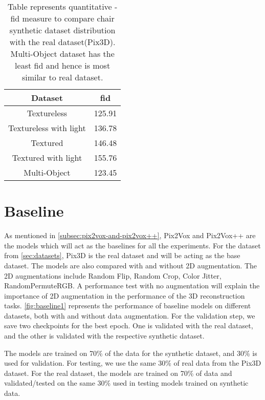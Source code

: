 \begin{table}[ht]
    \centering
    \begin{tabular}{|c |c |}
        \hline
        Dataset & \gls{fid} \\ [0.5ex]
        \hline\hline
        Textureless & 125.91 \\
        \hline
        Textureless with light & 136.78 \\
        \hline
        Textured  & 146.48 \\
        \hline
        Textured with light  & 155.76 \\
        \hline
        Multi-Object & 123.45 \\[1ex]
        \hline
    \end{tabular}
    \caption{Table represents quantitative - \gls{fid} measure to compare chair synthetic dataset distribution with the real dataset(Pix3D).
    Multi-Object dataset has the least \gls{fid} and hence is most similar to real dataset.}
    \label{tab:quantitative-dataset-comparison-chair-dataset}
\end{table}

\section{Baseline}\label{sec:baseline}

As mentioned in \autoref{subsec:pix2vox-and-pix2vox++}, Pix2Vox and Pix2Vox++ are the models which will act as the baselines for all the experiments.
For the dataset from \autoref{sec:datasets}, Pix3D is the real dataset and will be acting as the base dataset.
The models are also compared with and without 2D augmentation.
The 2D augmentations include Random Flip, Random Crop, Color Jitter, RandomPermuteRGB\@.
A performance test with no augmentation will explain the importance of 2D augmentation in the performance of the 3D reconstruction tasks.
\autoref{fig:baseline1} represents the performance of baseline models on different datasets, both with and without data augmentation.
For the validation step, we save two checkpoints for the best epoch.
One is validated with the real dataset, and the other is validated with the respective synthetic dataset.

The models are trained on 70\% of the data for the synthetic dataset, and 30\% is used for validation.
For testing, we use the same 30\% of real data from the Pix3D dataset.
For the real dataset, the models are trained on 70\% of data and validated/tested on the same 30\% used in testing models trained on synthetic data.

